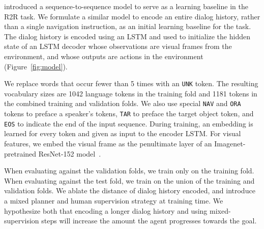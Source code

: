 
\citet{anderson:cvpr18} introduced a sequence-to-sequence model to serve as a learning baseline in the R2R task.
We formulate a similar model to encode an entire dialog history, rather than a single navigation instruction, as an initial learning baseline for the \task{} task.
The dialog history is encoded using an LSTM and used to initialize the hidden state of an LSTM decoder whose observations are visual frames from the environment, and whose outputs are actions in the environment (Figure~\ref{fig:model}).

We replace words that occur fewer than 5 times with an \texttt{UNK} token.
The resulting vocabulary sizes are 1042 language tokens in the training fold and 1181 tokens in the combined training and validation folds.
We also use special \texttt{NAV} and \texttt{ORA} tokens to preface a speaker's tokens, \texttt{TAR} to preface the target object token, and \texttt{EOS} to indicate the end of the input sequence.
During training, an embedding is learned for every token and given as input to the encoder LSTM.
For visual features, we embed the visual frame as the penultimate layer of an Imagenet-pretrained ResNet-152 model~\cite{he:cvpr16}.

When evaluating against the validation folds, we train only on the training fold.
When evaluating against the test fold, we train on the union of the training and validation folds.
We ablate the distance of dialog history encoded, and introduce a mixed planner and human supervision strategy at training time.
We hypothesize both that encoding a longer dialog history and using mixed-supervision steps will increase the amount the agent progresses towards the goal.

